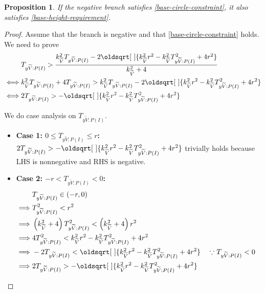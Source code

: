 \documentclass[a4paper,12pt]{article}
\newcommand{\HSview}[1][V]{\widetilde{#1}}
\newcommand{\HSTy}[1][I]{T_{y\HSview:#1}}
\renewcommand*{\sqrt}[2][\ ]{\oldsqrt[#1]{#2} }
\newtheorem{proposition}[theorem]{Proposition}
\theoremstyle{definition}
\theoremstyle{plain}
\begin{document}
	\newpage

	\begin{proposition}
		If the negative branch satisfies \eqref{base-circle-constraint}, it also satisfies \eqref{base-height-requirement}.
	\end{proposition}
	\begin{proof}
		Assume that the branch is negative and that \eqref{base-circle-constraint} holds.
		We need to prove
		\begin{align*}
			&\HSTy[P(I)] > \frac{k^2_{\HSview}\HSTy[P(I)] - 2\sqrt{k^2_{\HSview}r^2 - k^2_{\HSview}\HSTy[P(I)]^2 + 4r^2}}{k^2_{\HSview} + 4}\\
			\iff& k^2_{\HSview}\HSTy[P(I)] + 4\HSTy[P(I)] > k^2_{\HSview}\HSTy[P(I)] - 2\sqrt{k^2_{\HSview}r^2 - k^2_{\HSview}\HSTy[P(I)]^2 + 4r^2}\\
			\iff & 2\HSTy[P(I)] > -\sqrt{k^2_{\HSview}r^2 - k^2_{\HSview}\HSTy[P(I)]^2 + 4r^2}
		\end{align*}

		We do case analysis on $\HSTy[P(I)]$.
		\begin{itemize}
			\item \textbf{Case 1: $0 \le \HSTy[P(I)] \le r$:}\\
				$2\HSTy[P(I)] > -\sqrt{k^2_{\HSview}r^2 - k^2_{\HSview}\HSTy[P(I)]^2 + 4r^2}$
				trivially holds because LHS is nonnegative and RHS is negative.

			\item \textbf{Case 2: $-r < \HSTy[P(I)] < 0$:}\\
				\begin{align*}
					&\HSTy[P(I)] \in \left(-r, 0\right)\\
					\implies & \HSTy[P(I)]^2 < r^2\\
					\implies & \left(k^2_{\HSview} + 4\right)\HSTy[P(I)]^2 < \left(k^2_{\HSview} + 4\right)r^2\\
					\implies & 4\HSTy[P(I)]^2 < k^2_{\HSview}r^2 - k^2_{\HSview}\HSTy[P(I)]^2 + 4r^2\\
					\implies & -2\HSTy[P(I)] < \sqrt{k^2_{\HSview}r^2 - k^2_{\HSview}\HSTy[P(I)]^2 + 4r^2} && \because \HSTy[P(I)] < 0\\
					\implies&2\HSTy[P(I)] > -\sqrt{k^2_{\HSview}r^2 - k^2_{\HSview}\HSTy[P(I)]^2 + 4r^2}\\
				\end{align*}

		\end{itemize}
	\end{proof}
	
\end{document}
